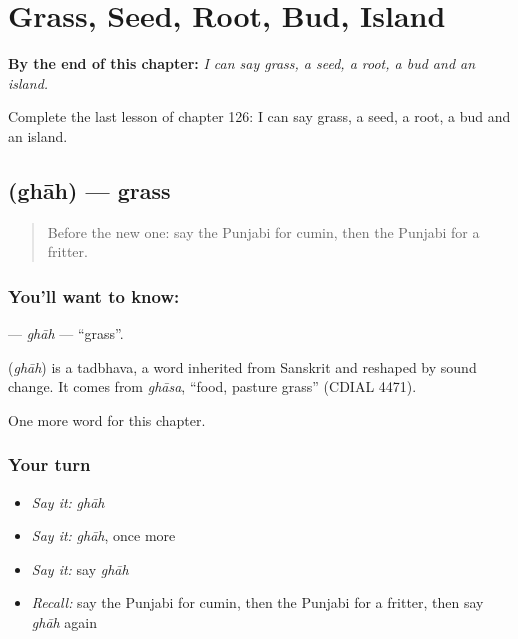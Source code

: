 
\chapter{Grass, Seed, Root, Bud, Island}
\label{ch:pa-grass-seed-root-bud-island}

\begin{chapteropening}
\textbf{By the end of this chapter:} \emph{I can say grass, a seed, a root, a bud and an island.}

Complete the last lesson of chapter 126: I can say grass, a seed, a root, a bud and an island.
\end{chapteropening}

\section[\texorpdfstring{\pa{ਘਾਹ} (ghāh)}{ਘਾਹ (ghāh)}]{ (ghāh) — grass}

\label{lesson:PA-C126-ghah}



\begin{quote}
Before the new one: say the Punjabi for cumin, then the Punjabi for a fritter.
\end{quote}

\subsection*{You'll want to know: }
\textbf{} — \emph{ghāh} — \textquotedblleft{}grass\textquotedblright{}.

\begin{cousinweb}
\textbf{} (\emph{ghāh}) is a tadbhava, a word inherited from Sanskrit and reshaped by sound change. It comes from \emph{ghāsa}, \textquotedblleft{}food, pasture grass\textquotedblright{} (CDIAL 4471).
\end{cousinweb}

\begin{grammarlens}[title={What you've built}]
One more word for this chapter.
\end{grammarlens}

\subsection*{Your turn}
\begin{itemize}
\raggedright
  \item \emph{Say it:} \emph{ghāh}
  \item \emph{Say it:} \emph{ghāh}, once more
  \item \emph{Say it:} say \emph{ghāh}
  \item \emph{Recall:} say the Punjabi for cumin, then the Punjabi for a fritter, then say \emph{ghāh} again
\end{itemize}

